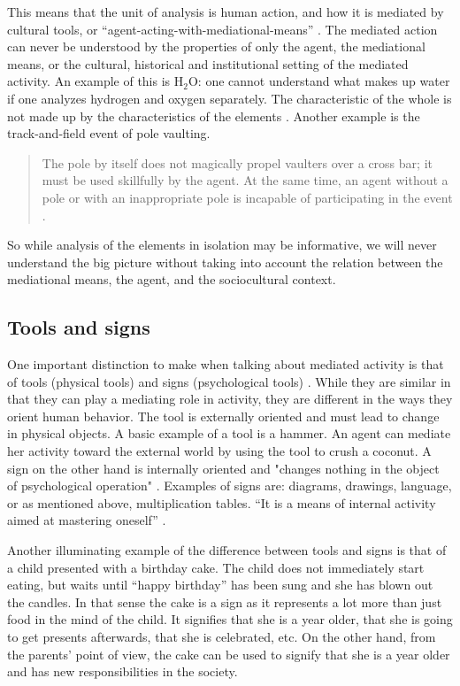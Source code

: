 This means that the unit of analysis is human action, and how it is mediated by cultural tools, or “agent-acting-with-mediational-means” \citep[\citealp{wertsch1993sociocultural} referenced in][]{wertsch1998mind}. The mediated action can never be understood by the properties of only the agent, the mediational means, or the cultural, historical and institutional setting of the mediated activity. An example of this is $\text{H}_2\text{O}$: one cannot understand what makes up water if one analyzes hydrogen and oxygen separately. The characteristic of the whole is not made up by the characteristics of the elements \citep{vygotskiui1978mind}. Another example is the track-and-field event of pole vaulting. 
\begin{quote}
The pole by itself does not magically propel vaulters over a cross bar; it must be used skillfully by the agent. At the same time, an agent without a pole or with an inappropriate pole is incapable of participating in the event \citep[p. 27]{wertsch1998mind}. 
\end{quote}
So while analysis of the elements in isolation may be informative, we will never understand the big picture without taking into account the relation between the mediational means, the agent, and the sociocultural context. 

\subsection{Tools and signs}
One important distinction to make when talking about mediated activity is that of tools (physical tools) and signs (psychological tools) \citep{vygotskiui1978mind}. While they are similar in that they can play a mediating role in activity, they are different in the ways they orient human behavior. The tool is externally oriented and must lead to change in physical objects. A basic example of a tool is a hammer. An agent can mediate her activity toward the external world by using the tool to crush a coconut. A sign on the other hand is internally oriented and "changes nothing in the object of psychological operation" \citep[p. 55]{vygotskiui1978mind}. Examples of signs are: diagrams, drawings, language, or as mentioned above, multiplication tables. “It is a means of internal activity aimed at mastering oneself” \citep[p. 55]{vygotskiui1978mind}. 

Another illuminating example of the difference between tools and signs is that of a child presented with a birthday cake. The child does not immediately start eating, but waits until “happy birthday” has been sung and she has blown out the candles. In that sense the cake is a sign as it represents a lot more than just food in the mind of the child. It signifies that she is a year older, that she is going to get presents afterwards, that she is celebrated, etc. On the other hand, from the parents’ point of view, the cake can be used to signify that she is a year older and has new responsibilities in the society. 

